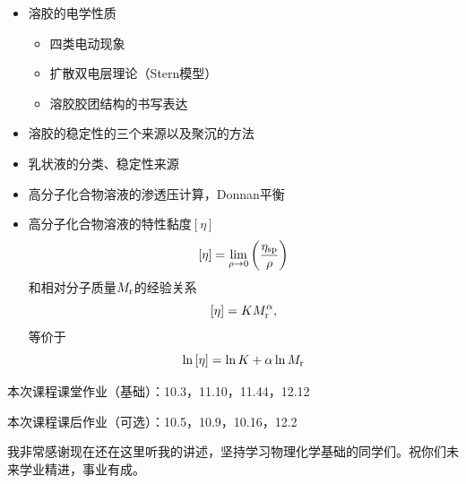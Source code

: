 \documentclass[9pt]{beamer}
\newcommand\rr{{\rm r}}
\begin{document}
	\begin{frame}
	
	\begin{itemize}
	
	\item 溶胶的电学性质
		\begin{itemize}
	
		\item 四类电动现象
		
		\item 扩散双电层理论（Stern模型）
		
		\item 溶胶胶团结构的书写表达
	
		\end{itemize}
		
	\item 溶胶的稳定性的三个来源以及聚沉的方法
	
	\item 乳状液的分类、稳定性来源
	
	\item 高分子化合物溶液的渗透压计算，Donnan平衡
	
	\item 高分子化合物溶液的特性黏度$[\eta]$
	\[
		[ \eta ] = \lim_{\rho\rightarrow0} \left( \frac{ \eta_{\rm sp} }{ \rho }  \right)
	\]	
	和相对分子质量$M_\rr$的经验关系
	\[
		[ \eta ] = K M^\alpha_\rr,
	\]
	等价于
	\[
		\ln{ [ \eta ] } = \ln{K} + \alpha \ln{ M_\rr }
	\]
	
	\end{itemize}		
	
	\end{frame}
	
	\begin{frame}

	本次课程课堂作业（基础）：10.3，11.10，11.44，12.12
	
	\hspace*{\fill}	
	
	本次课程课后作业（可选）：10.5，10.9，10.16，12.2
	
	\hspace*{\fill}
	
	{\color{red}我非常感谢现在还在这里听我的讲述，坚持学习物理化学基础的同学们。祝你们未来学业精进，事业有成。}
	
	\end{frame}
\end{document}
